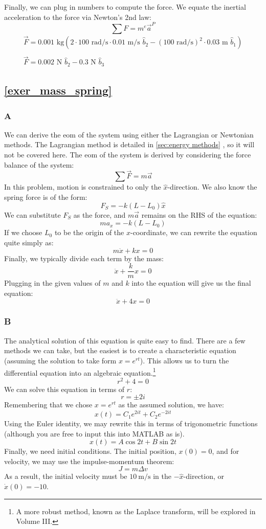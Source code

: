 \documentclass[10pt, openany, titlepage]{book}
\theoremstyle{definition}
\let\oldautoref\autoref
\renewcommand{\autoref}[1]{%
  \begingroup
  \hypersetup{linkcolor=black}%
  \oldautoref{#1}%
  \endgroup
}
\begin{document}
Finally, we can plug in numbers to compute the force. We equate the inertial acceleration to the force via Newton's 2nd law:
$$\sum F=m^e\vec{a}^P$$
\begin{gather}
\vec{F}=0.001\text{ kg}\left(2\cdot100\text{ rad/s}\cdot{0.01\text{ m/s }}\hat{b}_2-(100\text{ rad/s})^2\cdot0.03\text{ m }\hat{b}_1\right)\\\\
\vec{F}=0.002\text{ N }\hat{b}_2-0.3 \text{ N }\hat{b}_3 
\end{gather}

\subsection*{\texorpdfstring{\autoref{exer_mass_spring}}{Mass Spring EOM}}

\subsubsection{A}
We can derive the \gls{eom} of the system using either the \gls{Lagrangian} or Newtonian methods. The Lagrangian method is detailed in \autoref{sec:energy methods}, so it will not be covered here. The \gls{eom} of the system is derived by considering the force balance of the system:
    $$\sum \vec{F}=m\vec{a}$$
    In this problem, motion is constrained to only the $\hat{x}$-direction. We also know the spring force is of the form:
    $$F_S=-k(L-L_0)\hat{x}$$
    We can substitute $F_S$ as the force, and $m\vec{a}$ remains on the RHS of the equation:
    $$ma_x=-k(L-L_0)$$
    If we choose $L_0$ to be the origin of the $x$-coordinate, we can rewrite the equation quite simply as:
    $$m\ddot{x}+k{x}=0$$
    Finally, we typically divide each term by the mass:
    $$\ddot{x}+\frac{k}{m}{x}=0$$Plugging in the given values of $m$ and $k$ into the equation will give us the final equation:
    $$\ddot{x}+4{x}=0$$

    \subsubsection{B}
    The analytical solution of this equation is quite easy to find. There are a few methods we can take, but the easiest is to create a characteristic equation (assuming the solution to take form $x=e^{rt}$). This allows us to turn the differential equation into an algebraic equation.\footnote{A more robust method, known as the Laplace transform, will be explored in Volume III.}
    $$r^2+4=0$$
    We can solve this equation in terms of $r$:
    $$r=\pm 2i$$
    Remembering that we chose $x=e^{rt}$ as the assumed solution, we have:
    $$x(t)=C_1e^{2it}+C_2e^{-2it}$$
    Using the Euler identity, we may rewrite this in terms of trigonometric functions (although you are free to input this into MATLAB as is).
    $$x(t)=A\cos{2t}+B\sin{2t}$$
    Finally, we need initial conditions. The initial position, $x(0)=0$, and for velocity, we may use the impulse-momentum theorem:
    $$J=m\Delta v$$
As a result, the initial velocity must be $10 \ \mathrm{m/s}$ in the $-\hat{x}$-direction, or $\dot{x}(0)=-10$.
\end{document}
